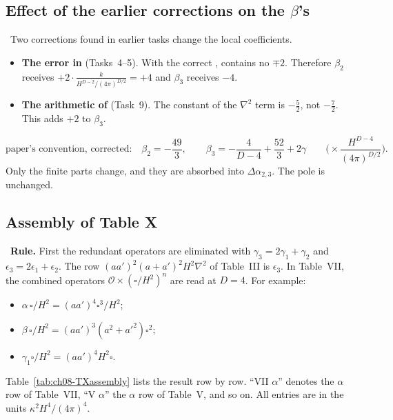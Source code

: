 \subsection{Effect of the earlier corrections on the $\beta$'s}
\label{sec:ch08-betacorr}
\tD\ Two corrections found in earlier tasks change the local coefficients.
\begin{itemize}[leftmargin=*,itemsep=2pt]
\item \textbf{The error in } (Tasks~4--5). With the correct ,  contains no $\mp2$.
Therefore $\beta_2$ receives $+2\cdot\frac{k}{H^{D-2}/(4\pi)^{D/2}}=+4$ and $\beta_3$ receives $-4$.
\item \textbf{The arithmetic of } (Task~9). The constant of the $\nabla^2$ term is $-\tfrac52$, not $-\tfrac72$. This adds $+2$ to $\beta_3$.
\end{itemize}
\begin{equation}
\text{paper's convention, corrected:}\quad \beta_2=-\frac{49}3,\qquad \beta_3=-\frac4{D-4}+\frac{52}3+2\gamma\qquad\Big(\times\frac{H^{D-4}}{(4\pi)^{D/2}}\Big).
\label{eq:ch08-betacorr}
\end{equation}
Only the finite parts change, and they are absorbed into $\Delta\alpha_{2,3}$. The pole is unchanged.

\subsection{Assembly of Table X}
\tD\ \textbf{Rule.} First the redundant operators are eliminated with $\gamma_3=2\gamma_1+\gamma_2$ and $\epsilon_3=2\epsilon_1+\epsilon_2$. The row $(aa')^2(a+a')^2H^2\nabla^2$ of Table~III is $\epsilon_3$.
In Table~VII, the combined operators $\mathcal O\times(\square/H^2)^n$ are read at $D=4$. For example:
\begin{itemize}[itemsep=0pt]
\item $\alpha\,\square/H^2=(aa')^4\square^3/H^2$;
\item $\beta\,\square/H^2=(aa')^3(a^2+a'^2)\square^2$;
\item $\gamma_1\square/H^2=(aa')^4H^2\square$.
\end{itemize}
Table~\ref{tab:ch08-TXassembly} lists the result row by row. ``VII $\alpha$'' denotes the $\alpha$ row of Table~VII, ``V $\alpha$'' the $\alpha$ row of Table~V, and so on.
All entries are in the units $\kappa^2H^4/(4\pi)^4$.


